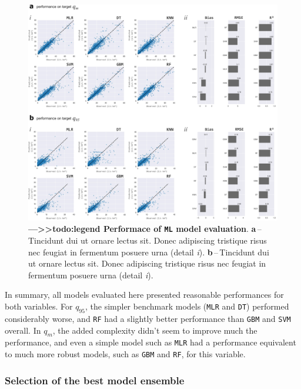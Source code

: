\documentclass[12pt]{article}
\begin{document}
\FloatBarrier
\begin{figure}[htb] %
	\centering                                       
	\includegraphics[width=0.98\linewidth]{figs/04_performance.png}    
	\caption[Performace of model evaluation]
	{ \textbf{---\;>>todo:legend Performace of \texttt{ML} model evaluation}.
		\textbf{a}\,--\,Tincidunt dui ut ornare lectus sit. Donec adipiscing tristique risus nec feugiat in fermentum posuere urna (detail \textrm{\textit{i}}).
		\textbf{b}\,--\,Tincidunt dui ut ornare lectus sit. Donec adipiscing tristique risus nec feugiat in fermentum posuere urna (detail \textrm{\textit{i}}).		
	}
	\label{fig:perf}  %
\end{figure}

\par In summary, all models evaluated here presented reasonable performances for both variables. For $q_{95}$, the simpler benchmark models (\texttt{MLR} and \texttt{DT}) performed considerably worse, and \texttt{RF} had a slightly better performance than \texttt{GBM} and \texttt{SVM} overall. In $q_{m}$, the added complexity didn’t seem to improve much the performance, and even a simple model such as \texttt{MLR} had a performance equivalent to much more robust models, such as \texttt{GBM} and \texttt{RF}, for this variable.

\subsubsection{Selection of the best model ensemble} \label{sec:datagen:proceval:best}
\end{document}
